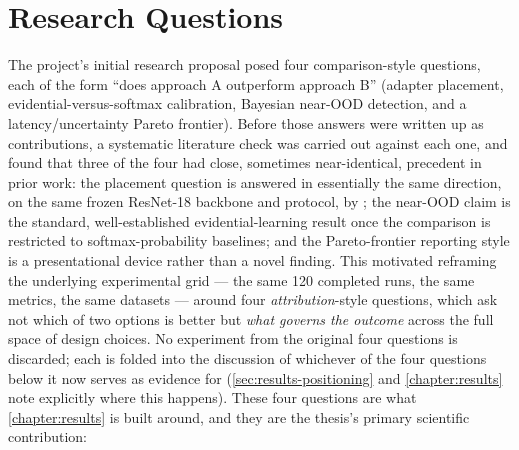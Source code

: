 \documentclass{iutbscthesis}
\begin{document}
\section{Research Questions}
\label{sec:intro-rqs}

The project's initial research proposal posed four comparison-style questions, each of the form ``does approach A outperform approach B'' (adapter placement, evidential-versus-softmax calibration, Bayesian near-OOD detection, and a latency/uncertainty Pareto frontier). Before those answers were written up as contributions, a systematic literature check was carried out against each one, and found that three of the four had close, sometimes near-identical, precedent in prior work: the placement question is answered in essentially the same direction, on the same frozen ResNet-18 backbone and protocol, by \textcite{li2022tsa}; the near-OOD claim is the standard, well-established evidential-learning result once the comparison is restricted to softmax-probability baselines; and the Pareto-frontier reporting style is a presentational device rather than a novel finding. This motivated reframing the underlying experimental grid — the same 120 completed runs, the same metrics, the same datasets — around four \emph{attribution}-style questions, which ask not which of two options is better but \emph{what governs the outcome} across the full space of design choices. No experiment from the original four questions is discarded; each is folded into the discussion of whichever of the four questions below it now serves as evidence for (\autoref{sec:results-positioning} and \autoref{chapter:results} note explicitly where this happens). These four questions are what \autoref{chapter:results} is built around, and they are the thesis's primary scientific contribution:
\end{document}
